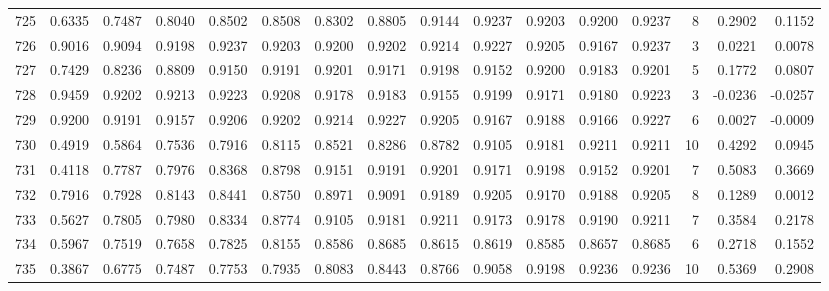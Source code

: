 \begin{tabular}{lrrrrrrrrrrrrrrr}
725 &      0.6335 &  0.7487 &  0.8040 &  0.8502 &  0.8508 &  0.8302 &  0.8805 &  0.9144 &  0.9237 &  0.9203 &   0.9200 &     0.9237 &      8 &                    0.2902 &                     0.1152 \\
726 &      0.9016 &  0.9094 &  0.9198 &  0.9237 &  0.9203 &  0.9200 &  0.9202 &  0.9214 &  0.9227 &  0.9205 &   0.9167 &     0.9237 &      3 &                    0.0221 &                     0.0078 \\
727 &      0.7429 &  0.8236 &  0.8809 &  0.9150 &  0.9191 &  0.9201 &  0.9171 &  0.9198 &  0.9152 &  0.9200 &   0.9183 &     0.9201 &      5 &                    0.1772 &                     0.0807 \\
728 &      0.9459 &  0.9202 &  0.9213 &  0.9223 &  0.9208 &  0.9178 &  0.9183 &  0.9155 &  0.9199 &  0.9171 &   0.9180 &     0.9223 &      3 &                   -0.0236 &                    -0.0257 \\
729 &      0.9200 &  0.9191 &  0.9157 &  0.9206 &  0.9202 &  0.9214 &  0.9227 &  0.9205 &  0.9167 &  0.9188 &   0.9166 &     0.9227 &      6 &                    0.0027 &                    -0.0009 \\
730 &      0.4919 &  0.5864 &  0.7536 &  0.7916 &  0.8115 &  0.8521 &  0.8286 &  0.8782 &  0.9105 &  0.9181 &   0.9211 &     0.9211 &     10 &                    0.4292 &                     0.0945 \\
731 &      0.4118 &  0.7787 &  0.7976 &  0.8368 &  0.8798 &  0.9151 &  0.9191 &  0.9201 &  0.9171 &  0.9198 &   0.9152 &     0.9201 &      7 &                    0.5083 &                     0.3669 \\
732 &      0.7916 &  0.7928 &  0.8143 &  0.8441 &  0.8750 &  0.8971 &  0.9091 &  0.9189 &  0.9205 &  0.9170 &   0.9188 &     0.9205 &      8 &                    0.1289 &                     0.0012 \\
733 &      0.5627 &  0.7805 &  0.7980 &  0.8334 &  0.8774 &  0.9105 &  0.9181 &  0.9211 &  0.9173 &  0.9178 &   0.9190 &     0.9211 &      7 &                    0.3584 &                     0.2178 \\
734 &      0.5967 &  0.7519 &  0.7658 &  0.7825 &  0.8155 &  0.8586 &  0.8685 &  0.8615 &  0.8619 &  0.8585 &   0.8657 &     0.8685 &      6 &                    0.2718 &                     0.1552 \\
735 &      0.3867 &  0.6775 &  0.7487 &  0.7753 &  0.7935 &  0.8083 &  0.8443 &  0.8766 &  0.9058 &  0.9198 &   0.9236 &     0.9236 &     10 &                    0.5369 &                     0.2908 \\

\end{tabular}
